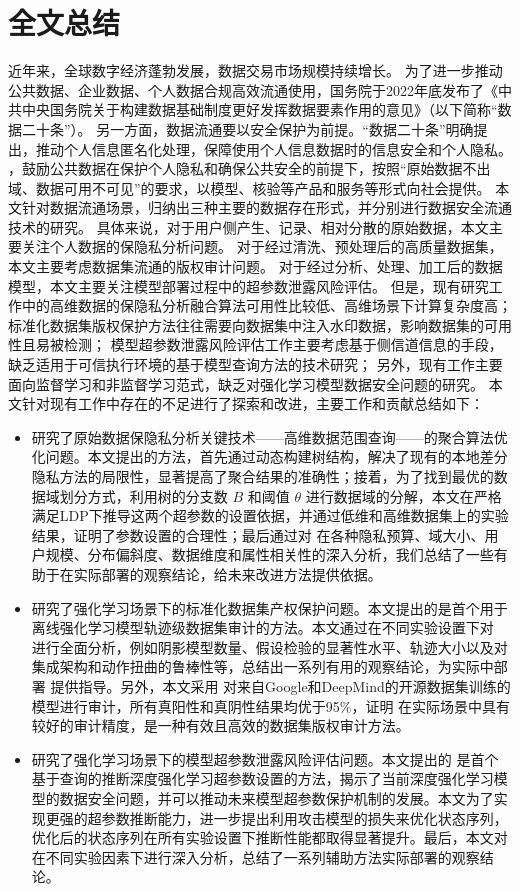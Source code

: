 \section{全文总结}
近年来，全球数字经济蓬勃发展，数据交易市场规模持续增长。
为了进一步推动公共数据、企业数据、个人数据合规高效流通使用，国务院于2022年底发布了《中共中央国务院关于构建数据基础制度更好发挥数据要素作用的意见》（以下简称“数据二十条”）。
另一方面，数据流通要以安全保护为前提。“数据二十条”明确提出，推动个人信息匿名化处理，保障使用个人信息数据时的信息安全和个人隐私。
，鼓励公共数据在保护个人隐私和确保公共安全的前提下，按照“原始数据不出域、数据可用不可见”的要求，以模型、核验等产品和服务等形式向社会提供。
本文针对数据流通场景，归纳出三种主要的数据存在形式，并分别进行数据安全流通技术的研究。
具体来说，对于用户侧产生、记录、相对分散的原始数据，本文主要关注个人数据的保隐私分析问题。
对于经过清洗、预处理后的高质量数据集，本文主要考虑数据集流通的版权审计问题。
对于经过分析、处理、加工后的数据模型，本文主要关注模型部署过程中的超参数泄露风险评估。
但是，现有研究工作中的高维数据的保隐私分析融合算法可用性比较低、高维场景下计算复杂度高；
标准化数据集版权保护方法往往需要向数据集中注入水印数据，影响数据集的可用性且易被检测；
模型超参数泄露风险评估工作主要考虑基于侧信道信息的手段，缺乏适用于可信执行环境的基于模型查询方法的技术研究；
另外，现有工作主要面向监督学习和非监督学习范式，缺乏对强化学习模型数据安全问题的研究。
本文针对现有工作中存在的不足进行了探索和改进，主要工作和贡献总结如下：
\begin{itemize}
    \item 研究了原始数据保隐私分析关键技术——高维数据范围查询——的聚合算法优化问题。本文提出的\myahead 方法，首先通过动态构建树结构，解决了现有的本地差分隐私方法的局限性，显著提高了聚合结果的准确性；接着，为了找到最优的数据域划分方式，\myahead 利用树的分支数 $B$ 和阈值 $\theta$ 进行数据域的分解，本文在严格满足LDP下推导这两个超参数的设置依据，并通过低维和高维数据集上的实验结果，证明了参数设置的合理性；最后通过对 \myahead 在各种隐私预算、域大小、用户规模、分布偏斜度、数据维度和属性相关性的深入分析，我们总结了一些有助于\myahead 在实际部署的观察结论，给未来改进方法提供依据。
    \item 研究了强化学习场景下的标准化数据集产权保护问题。本文提出的\sysnameo 是首个用于离线强化学习模型轨迹级数据集审计的方法。本文通过在不同实验设置下对 \sysnameo 进行全面分析，例如阴影模型数量、假设检验的显著性水平、轨迹大小以及对集成架构和动作扭曲的鲁棒性等，总结出一系列有用的观察结论，为实际中部署 \sysnameo 提供指导。另外，本文采用 \sysnameo 对来自Google和DeepMind的开源数据集训练的模型进行审计，所有真阳性和真阴性结果均优于95\%，证明 \sysnameo 在实际场景中具有较好的审计精度，是一种有效且高效的数据集版权审计方法。
    \item 研究了强化学习场景下的模型超参数泄露风险评估问题。本文提出的 \sysname 是首个基于查询的推断深度强化学习超参数设置的方法，揭示了当前深度强化学习模型的数据安全问题，并可以推动未来模型超参数保护机制的发展。本文为了实现更强的超参数推断能力，进一步提出利用攻击模型的损失来优化状态序列，优化后的状态序列在所有实验设置下推断性能都取得显著提升。最后，本文对\sysname 在不同实验因素下进行深入分析，总结了一系列辅助方法实际部署的观察结论。
\end{itemize}


